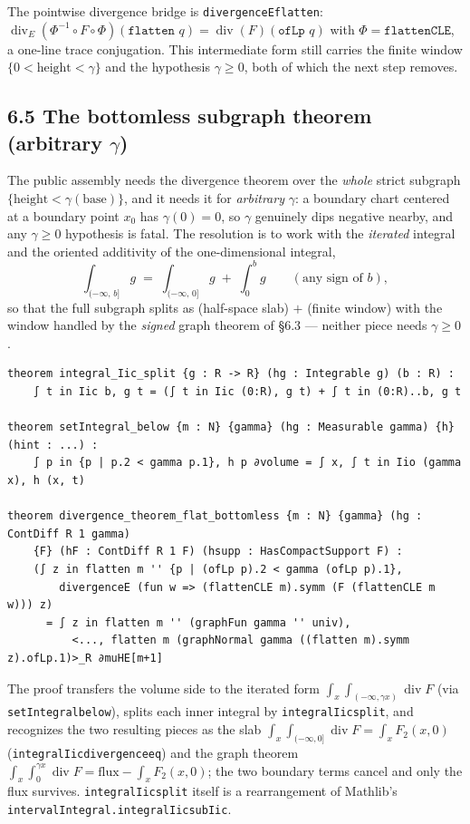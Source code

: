 ﻿\documentclass[12pt, a4paper]{article}
\renewcommand{\_}{\origunderscore\allowbreak}
\theoremstyle{definition}
\theoremstyle{plain}
\begin{document}
The pointwise divergence bridge is \texttt{divergenceE\_flatten}:
$\operatorname{div}_E(\Phi^{-1}\!\circ F\circ\Phi)(\texttt{flatten }q)=\operatorname{div}(F)(\texttt{ofLp }q)$
with $\Phi=\texttt{flattenCLE}$, a one-line trace conjugation.  This intermediate form still carries
the finite window $\{0<\text{height}<\gamma\}$ and the hypothesis $\gamma\ge0$, both of which the
next step removes.

\subsection{6.5 The bottomless subgraph theorem (arbitrary $\gamma$)}

The public assembly needs the divergence theorem over the \emph{whole} strict subgraph
$\{\text{height}<\gamma(\text{base})\}$, and it needs it for \emph{arbitrary} $\gamma$: a boundary
chart centered at a boundary point $x_0$ has $\gamma(0)=0$, so $\gamma$ genuinely dips negative
nearby, and any $\gamma\ge0$ hypothesis is fatal.  The resolution is to work with the
\emph{iterated} integral and the oriented additivity of the one-dimensional integral,
\[
  \int_{(-\infty,\,b]} g \;=\;\int_{(-\infty,\,0]} g \;+\;\int_0^{b} g\qquad(\text{any sign of }b),
\]
so that the full subgraph splits as (half-space slab) $+$ (finite window) with the window handled by
the \emph{signed} graph theorem of \S6.3 --- neither piece needs $\gamma\ge0$.

\begin{lstlisting}[caption={Oriented Iic-additivity, Fubini below a graph, and the bottomless theorem}]
theorem integral_Iic_split {g : R -> R} (hg : Integrable g) (b : R) :
    ∫ t in Iic b, g t = (∫ t in Iic (0:R), g t) + ∫ t in (0:R)..b, g t

theorem setIntegral_below {m : N} {gamma} (hg : Measurable gamma) {h} (hint : ...) :
    ∫ p in {p | p.2 < gamma p.1}, h p ∂volume = ∫ x, ∫ t in Iio (gamma x), h (x, t)

theorem divergence_theorem_flat_bottomless {m : N} {gamma} (hg : ContDiff R 1 gamma)
    {F} (hF : ContDiff R 1 F) (hsupp : HasCompactSupport F) :
    (∫ z in flatten m '' {p | (ofLp p).2 < gamma (ofLp p).1},
        divergenceE (fun w => (flattenCLE m).symm (F (flattenCLE m w))) z)
      = ∫ z in flatten m '' (graphFun gamma '' univ),
          <..., flatten m (graphNormal gamma ((flatten m).symm z).ofLp.1)>_R ∂muHE[m+1]
\end{lstlisting}

The proof transfers the volume side to the iterated form
$\int_x\int_{(-\infty,\gamma x)}\operatorname{div}F$ (via \texttt{setIntegral\_below}), splits each
inner integral by \texttt{integral\_Iic\_split}, and recognizes the two resulting pieces as the slab
$\int_x\int_{(-\infty,0]}\operatorname{div}F=\int_x F_2(x,0)$
(\texttt{integral\_Iic\_divergence\_eq}) and the graph theorem
$\int_x\int_0^{\gamma x}\operatorname{div}F=\text{flux}-\int_x F_2(x,0)$; the two boundary terms
cancel and only the flux survives.  \texttt{integral\_Iic\_split} itself is a rearrangement of
Mathlib's \texttt{intervalIntegral.integral\_Iic\_sub\_Iic}.
\end{document}
